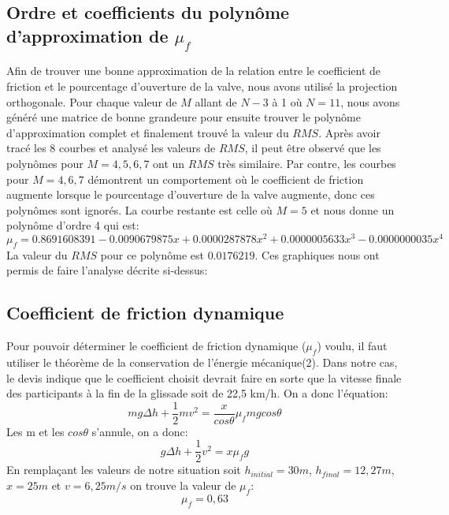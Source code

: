 \documentclass{article}
\begin{document}
\subsection{Ordre et coefficients du polynôme d'approximation de $\mu_f$}
Afin de trouver une bonne approximation de la relation entre le coefficient de friction et le pourcentage d'ouverture de la valve, nous avons utilisé la projection orthogonale. Pour chaque valeur de $M$ allant de $N-3$ à 1 où $N=11$, nous avons généré une matrice de bonne grandeure pour ensuite trouver le polynôme d'approximation complet et finalement trouvé la valeur du $RMS$. Après avoir tracé les 8 courbes et analysé les valeurs de $RMS$, il peut être observé que les polynômes pour $M=4,5,6,7$ ont un $RMS$ très similaire. Par contre, les courbes pour $M=4,6,7$ démontrent un comportement où le coefficient de friction augmente lorsque le pourcentage d'ouverture de la valve augmente, donc ces polynômes sont ignorés. La courbe restante est celle où $M=5$ et nous donne un polynôme d'ordre 4 qui est:
\begin{equation}
	\mu_f = 0.8691608391-0.0090679875x+0.0000287878x^2+0.0000005633x^3-0.0000000035x^4 
\end{equation}
La valeur du $RMS$ pour ce polynôme est $0.0176219$.
\newline
Ces graphiques nous ont permis de faire l'analyse décrite si-dessus:
\begin{center}
\end{center}

\subsection{Coefficient de friction dynamique}
Pour pouvoir déterminer le coefficient de friction dynamique ($\mu_f$) voulu, il faut utiliser le théorème de la conservation de l'énergie mécanique(2). Dans notre cas, le devis indique que le coefficient choisit devrait faire en sorte que la vitesse finale des participants à la fin de la glissade soit de 22,5 km/h. On a donc l'équation:
\begin{equation}
	mg\Delta h + \frac{1}{2}mv^2 = \frac{x}{cos\theta}\mu_fmgcos\theta 
\end{equation}
Les m et les $cos\theta$ s'annule, on a donc:
\begin{equation}
	g\Delta h + \frac{1}{2}v^2 = x\mu_fg 
\end{equation}
En remplaçant les valeurs de notre situation soit $h_{initial}=30m$, $h_{final}=12,27m$, $x=25m$ et $v=6,25m/s$ on trouve la valeur de $\mu_f$:
\begin{equation}
	\mu_f = 0,63
\end{equation}
\end{document}

